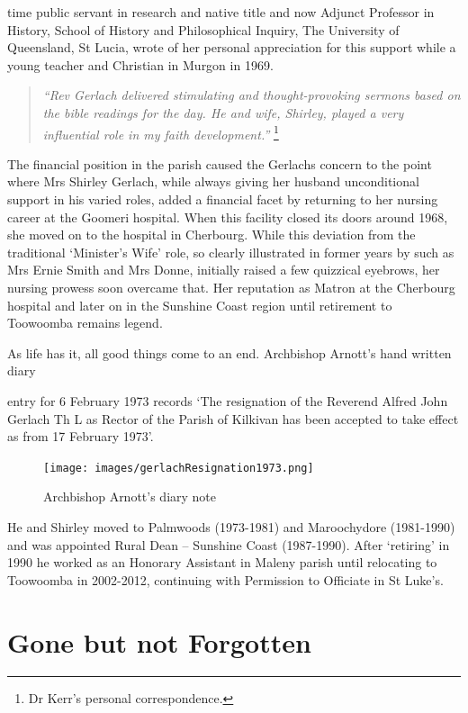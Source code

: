 time public servant in research and native title and now Adjunct
Professor in History, School of History and Philosophical Inquiry, The
University of Queensland, St Lucia, wrote of her personal appreciation
for this support while a young teacher and Christian in Murgon in 1969.

\begin{quote}
\emph{``Rev Gerlach delivered stimulating and thought-provoking sermons
based on the bible readings for the day. He and wife, Shirley, played a
very influential role in my faith development.''} \footnote{Dr Kerr's
  personal correspondence.}
\end{quote}

The financial position in the parish caused the Gerlachs concern to the
point where Mrs Shirley Gerlach, while always giving her husband
unconditional support in his varied roles, added a financial facet by
returning to her nursing career at the Goomeri hospital. When this
facility closed its doors around 1968, she moved on to the hospital in
Cherbourg. While this deviation from the traditional `Minister's Wife'
role, so clearly illustrated in former years by such as Mrs Ernie Smith
and Mrs Donne, initially raised a few quizzical eyebrows, her nursing
prowess soon overcame that. Her reputation as Matron at the Cherbourg
hospital and later on in the Sunshine Coast region until retirement to
Toowoomba remains legend.

As life has it, all good things come to an end. Archbishop Arnott's hand
written diary

entry for 6 February 1973 records `The resignation of the Reverend
Alfred John Gerlach Th L as Rector of the Parish of Kilkivan has been
accepted to take effect as from 17 February 1973'.




\begin{figure}[!h]
\begin{center}
\texttt{[image: images/gerlachResignation1973.png]}
\caption{Archbishop Arnott's diary note}
\end{center}
\end{figure}


He and Shirley moved to Palmwoods (1973-1981) and Maroochydore
(1981-1990) and was appointed Rural Dean -- Sunshine Coast (1987-1990).
After `retiring' in 1990 he worked as an Honorary Assistant in Maleny
parish until relocating to Toowoomba in 2002-2012, continuing with
Permission to Officiate in St Luke's.

\section{Gone but not Forgotten}

